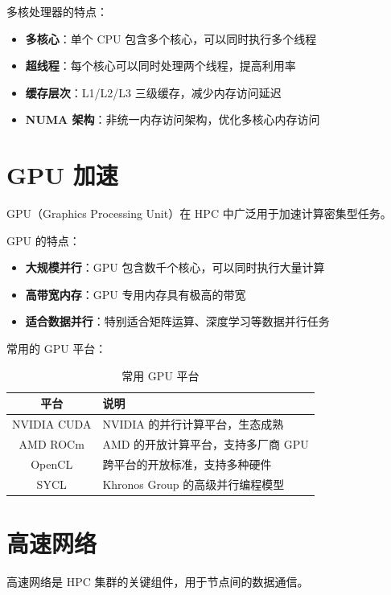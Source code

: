 \documentclass[12pt,UTF8]{ctexbook}
\begin{document}
多核处理器的特点：
\begin{itemize}
    \item \textbf{多核心}：单个 CPU 包含多个核心，可以同时执行多个线程
    \item \textbf{超线程}：每个核心可以同时处理两个线程，提高利用率
    \item \textbf{缓存层次}：L1/L2/L3 三级缓存，减少内存访问延迟
    \item \textbf{NUMA 架构}：非统一内存访问架构，优化多核心内存访问
\end{itemize}

\section{GPU 加速}
\label{sec:gpu_acceleration}

GPU（Graphics Processing Unit）在 HPC 中广泛用于加速计算密集型任务。

GPU 的特点：
\begin{itemize}
    \item \textbf{大规模并行}：GPU 包含数千个核心，可以同时执行大量计算
    \item \textbf{高带宽内存}：GPU 专用内存具有极高的带宽
    \item \textbf{适合数据并行}：特别适合矩阵运算、深度学习等数据并行任务
\end{itemize}

常用的 GPU 平台：
\begin{table}[htbp]
    \centering
    \caption{常用 GPU 平台}
    \begin{tabular}{|c|p{8cm}|}
        \hline
        \textbf{平台} & \textbf{说明} \\
        \hline
        NVIDIA CUDA & NVIDIA 的并行计算平台，生态成熟 \\
        \hline
        AMD ROCm & AMD 的开放计算平台，支持多厂商 GPU \\
        \hline
        OpenCL & 跨平台的开放标准，支持多种硬件 \\
        \hline
        SYCL & Khronos Group 的高级并行编程模型 \\
        \hline
    \end{tabular}
\end{table}

\section{高速网络}
\label{sec:high_speed_network}

高速网络是 HPC 集群的关键组件，用于节点间的数据通信。
\end{document}
